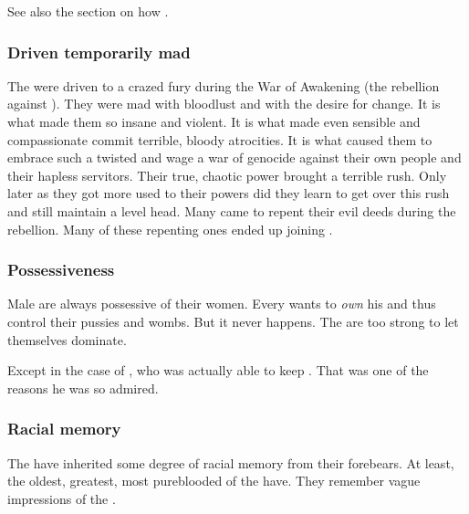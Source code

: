 See also the section on how .





\subsubsection{Driven temporarily mad}
The \resphain were driven to a crazed fury during the War of Awakening (the rebellion against \Merkyrah).
They were mad with bloodlust and with the desire for change.
It is what made them so insane and violent.
It is what made even sensible and compassionate \resphain commit terrible, bloody atrocities.
It is what caused them to embrace such a twisted  and wage a war of genocide against their own people and their hapless servitors.
Their true, chaotic power brought a terrible rush.
Only later as they got more used to their powers did they learn to get over this rush and still maintain a level head.
Many came to repent their evil deeds during the rebellion.
Many of these repenting ones ended up joining \Kezerad.





\subsubsection{Possessiveness}
Male \resphain{} are always possessive of their women. 
Every \resphan{} wants to \emph{own} his \resviel{} and thus control their pussies and wombs. 
But it never happens. 
The \resviel{} are too strong to let themselves dominate. 

Except in the case of \Zachirah, who was actually able to keep . 
That was one of the reasons he was so admired. 





\subsubsection{Racial memory}
The \resphain{} have inherited some degree of racial memory from their \SitraAchra forebears. At least, the oldest, greatest, most pureblooded of the \resphain{} have. They remember vague impressions of the  . 





